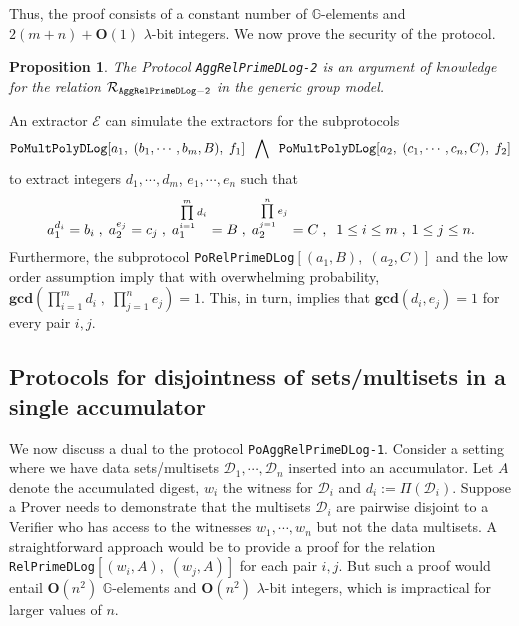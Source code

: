 \documentclass[11pt, lettersize, notitlepage, leqno, footskip=0.6cm]{article}
\newcommand{\pl}{\prod\limits}
\newcommand{\ttt}{\texttt}
\newcommand{\mc}{\mathcal}
\newcommand{\mb}{\mathbb}
\newcommand{\mbf}{\mathbf}
\newcommand{\lam}{\lambda}
\newcommand{\bO}{\mbf{O}}
\newcommand{\vs}{\vspace{-0.15cm}}
\newcommand{\noin}{\noindent}
\newcommand{\op}{overwhelming probability}
\newcommand{\GCD}{\mbf{gcd}}
\newcommand{\E}{\mc{E}}
\newtheorem{Prop}[Thm]{Proposition}
\numberwithin{equation}{section}
\begin{document}
\noin Thus, the proof consists of a constant number of $\mb{G}$-elements and $2(m+n)+\bO(1)$ $\lam$-bit integers. We now prove the security of the protocol.\vspace{0.2cm}


\begin{Prop} The Protocol \verb|AggRelPrimeDLog-2| is an argument of knowledge for the relation $\mc{R}_{\tt{AggRelPrimeDLog-2}}$ in the generic group
model.\end{Prop}

\begin{prf} An extractor $\E$ can simulate the extractors for the subprotocols \vs $$\ttt{PoMultPolyDLog}[a_1,\;(b_1,\cdots,b_m, B),\; f_1]\;\;\bigwedge\;\;\ttt{PoMultPolyDLog}[a_2,\;(c_1,\cdots,c_n, C),\; f_2] \vs $$ to extract integers $d_1,\cdots,d_m$, $e_1,\cdots,e_n$ such that \vs $$a_1^{d_i} = b_i\;,\;a_2^{e_j} = c_j \;,\; a_1^{\pl_{i=1}^m d_i} = B\;,\;a_2^{\pl_{j=1}^n e_j} = C \;,\;\;1\leq i\leq m\;,\;1\leq j\leq n. \vs $$ Furthermore, the subprotocol \verb|PoRelPrimeDLog|$[(a_1, B),\;(a_2, C)]$ and the low order assumption imply that with \op, $\GCD(\prod_{i=1}^m d_i\;,\; \prod_{j=1}^n e_j) = 1$. This, in turn, implies that $\GCD(d_i,e_j) = 1$ for every pair $i,j$.\end{prf}




\subsection{\fontsize{11}{11}\selectfont Protocols for disjointness of sets/multisets in a single accumulator} 


We now discuss a dual to the protocol \verb|PoAggRelPrimeDLog-1|. Consider a setting where we have data sets/multisets $\mc{D}_1,\cdots, \mc{D}_n$ inserted into an accumulator. Let $A$ denote the accumulated digest, $w_i$ the witness for $\mc{D}_i$ and $d_i:= \Pi(\mc{D}_i)$. Suppose a Prover needs to demonstrate that the multisets $\mc{D}_i$ are pairwise disjoint to a Verifier who has access to the witnesses $w_1,\cdots,w_n$ but not the data multisets. A straightforward approach would be to provide a proof for the relation \verb|RelPrimeDLog|$[(w_i, A),\;(w_j, A)]$ for each pair $i,j$. But such a proof would entail $\mbf{O}(n^2)$ $\mb{G}$-elements and $\mbf{O}(n^2)$ $\lam$-bit integers, which is impractical for larger values of $n$.
\end{document}
